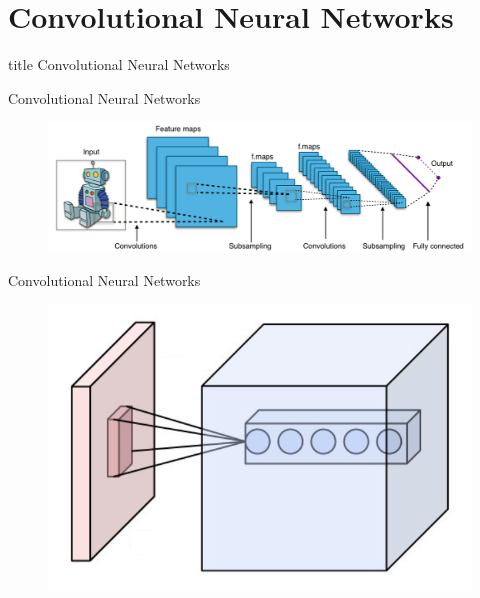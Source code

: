 \documentclass[18pt]{beamer}
\begin{document}
\section{Convolutional Neural Networks}
\begin{frame}
    \vfill
    \centering
    \begin{beamercolorbox}[sep=8pt,center,shadow=true,rounded=true]{title}
      Convolutional Neural Networks
    \end{beamercolorbox}
    \vfill
\end{frame}

\begin{frame}{Convolutional Neural Networks}
    \begin{figure}[h]
        \centering
        \includegraphics[width=1\textwidth]{Typical_cnn.png}
        \end{figure}
\end{frame}

\begin{frame}{Convolutional Neural Networks}
    \begin{figure}[h]
        \centering
        \includegraphics[width=1\textwidth]{Conv_layer.png}
        \end{figure}
\end{frame}
\end{document}
